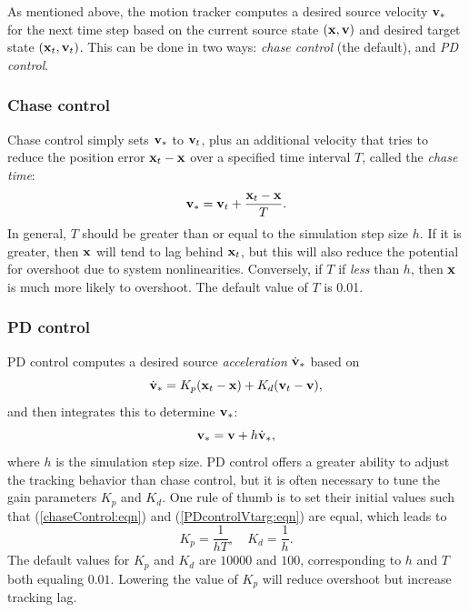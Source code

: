 As mentioned above, the motion tracker computes a desired source velocity
${\bf v}_*$ for the next time step based on the current source state $({\bf x}, {\bf v})$ and
desired target state $({\bf x}_t, {\bf v}_t)$. This can be done in two ways: {\it
chase control} (the default), and {\it PD control}.

\subsubsection{Chase control}
\label{ChaseControl:sec}

Chase control simply sets ${\bf v}_*$ to ${\bf v}_t$, plus an additional velocity that
tries to reduce the position error ${\bf x}_t - {\bf x}$ over a specified time interval
$T$, called the {\it chase time}:
%
\begin{equation}
{\bf v}_* = {\bf v}_t + \frac{{\bf x}_t - {\bf x}}{T}.
\label{chaseControl:eqn}
\end{equation}
%
In general, $T$ should be greater than or equal to the simulation step size
$h$. If it is greater, then ${\bf x}$ will tend to lag behind ${\bf x}_t$, but this will
also reduce the potential for overshoot due to system
nonlinearities. Conversely, if $T$ if {\it less} than $h$, then ${\bf x}$ is much
more likely to overshoot.  The default value of $T$ is 0.01.

\subsubsection{PD control}
\label{PDControl:sec}

PD control computes a desired source {\it acceleration} $\dot{{\bf v}}_*$ based on
%
\begin{equation}
\dot{{\bf v}}_* = K_p ({\bf x}_t - {\bf x}) + K_d ({\bf v}_t - {\bf v}),
\label{PDcontrol:eqn}
\end{equation}
%
and then integrates this to determine ${\bf v}_*$:
%
\begin{equation}
{\bf v}_* = {\bf v} + h \dot{{\bf v}}_*,
\label{PDcontrolVtarg:eqn}
\end{equation}
%
where $h$ is the simulation step size. PD control offers a greater ability to
adjust the tracking behavior than chase control, but it is often necessary to
tune the gain parameters $K_p$ and $K_d$. One rule of thumb is to
set their initial values such that (\ref{chaseControl:eqn}) and
(\ref{PDcontrolVtarg:eqn}) are equal, which leads to
%
\begin{equation*}
K_p = \frac{1}{h T}, \quad K_d = \frac{1}{h}.
\end{equation*}
%
The default values for $K_p$ and $K_d$ are $10000$ and $100$, corresponding to
$h$ and $T$ both equaling $0.01$. Lowering the value of $K_p$ will reduce
overshoot but increase tracking lag.

